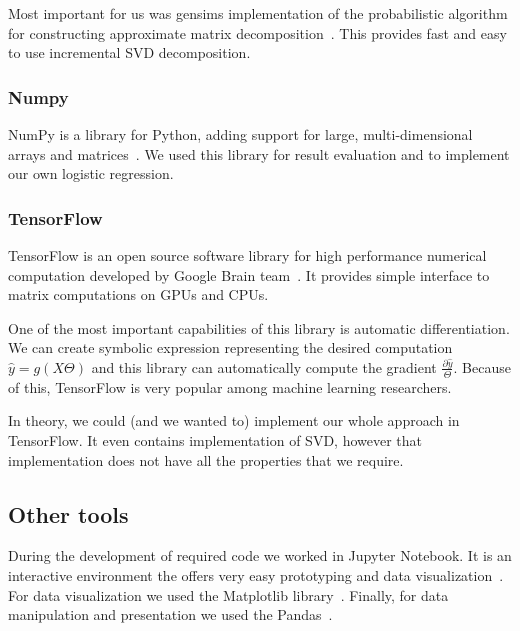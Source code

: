     Most important for us was gensims implementation of the probabilistic algorithm for constructing approximate matrix decomposition~\cite{halko2011finding}.
    This provides fast and easy to use incremental SVD decomposition.
    
    \subsubsection{Numpy}
    
    NumPy is a library for Python, adding support for large, multi-dimensional arrays and matrices~\cite{oliphant2006guide}. %
    We used this library for result evaluation and to implement our own logistic regression.
    
    \subsubsection{TensorFlow}
    
    TensorFlow is an open source software library for high performance numerical computation developed by Google Brain team~\cite{tensorflow2015-whitepaper}. 
    It provides simple interface to matrix computations on GPUs and CPUs.
    
    One of the most important capabilities of this library is automatic differentiation.
    We can create symbolic expression representing the desired computation $\hat{y}=g(X\Theta)$ and this library can automatically compute the gradient $\frac{\partial \hat{y}}{\Theta}$.
    Because of this, TensorFlow is very popular among  machine learning researchers.
    
    In theory, we could (and we wanted to) implement our whole approach in TensorFlow.
    It even contains implementation of SVD, however that implementation does not have all the properties that we require.
    
    \subsection{Other tools}
    
    During the development of required code we worked in Jupyter Notebook. 
    It is an interactive environment the offers very easy prototyping and
    data visualization~\cite{PER-GRA:2007}. %
    For data visualization we used the Matplotlib library~\cite{hunter2007matplotlib}. %
    Finally, for data manipulation and presentation we used the Pandas~\cite{mckinney2010data}. %
    
